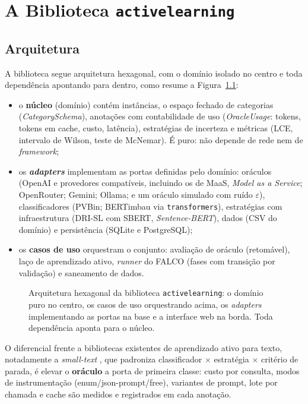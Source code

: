 \chapter{A Biblioteca \texorpdfstring{\texttt{activelearning}}{activelearning}}
\label{ap:biblioteca}

\section{Arquitetura}

A biblioteca segue arquitetura hexagonal, com o domínio isolado no centro e
toda dependência apontando para dentro, como resume a
Figura~\ref{fig:ap-biblioteca-arq}:

\begin{itemize}
  \item o \textbf{núcleo} (domínio) contém instâncias, o espaço fechado de
  categorias (\textit{CategorySchema}), anotações com contabilidade de uso
  (\textit{OracleUsage}: tokens, tokens em cache, custo, latência),
  estratégias de incerteza e métricas (LCE, intervalo de Wilson, teste de
  McNemar). É puro: não depende de rede nem de \textit{framework};
  \item os \textbf{\textit{adapters}} implementam as portas definidas pelo
  domínio: oráculos (OpenAI e provedores compatíveis, incluindo os de
  MaaS, \textit{Model as a Service}; OpenRouter; Gemini; Ollama; e um
  oráculo simulado com ruído $\varepsilon$), classificadores (PVBin;
  BERTimbau via \texttt{transformers}), estratégias com infraestrutura
  (DRI-SL com SBERT, \textit{Sentence-BERT}), dados (CSV do domínio) e
  persistência (SQLite e PostgreSQL);
  \item os \textbf{casos de uso} orquestram o conjunto: avaliação de
  oráculo (retomável), laço de aprendizado ativo, \textit{runner} do FALCO
  (fases com transição por validação) e saneamento de dados.
\end{itemize}

\begin{figure}[htbp]
    \centering
    
    \caption{Arquitetura hexagonal da biblioteca \texttt{activelearning}:
    o domínio puro no centro, os casos de uso orquestrando acima, os
    \textit{adapters} implementando as portas na base e a interface web na
    borda. Toda dependência aponta para o núcleo.}
    \label{fig:ap-biblioteca-arq}
\end{figure}

O diferencial frente a bibliotecas existentes de aprendizado ativo para
texto, notadamente a \textit{small-text} \citep{Schroder2021SmallText}, que
padroniza classificador $\times$ estratégia $\times$ critério de parada, é
elevar o \textbf{oráculo} a porta de primeira classe: custo por consulta,
modos de instrumentação (enum/json-prompt/free), variantes de prompt, lote
por chamada e cache são medidos e registrados em cada anotação.

